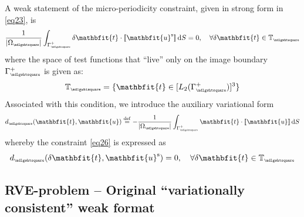 \documentclass[12pt,a4paper]{article}
\renewcommand{\ta}[1]{\mathbfit{#1}}
\renewcommand{\Box}{\mdlgwhtsquare}
\DeclarePairedDelimiter{\jmp}{[\![}{]\!]}
\newcommand{\volume}{|\Omega_\rve|}
\newcommand{\rve}{
  {\mathchoice
   {\mbox{\scalebox{0.67}{$\Box$}}}
   {\mbox{\scalebox{0.67}{$\Box$}}}
   {\mbox{\scalebox{0.5}{$\Box$}}}
   {\mbox{\scalebox{0.375}{$\Box$}}}
  }
}
\begin{document}
A weak statement of the micro-periodicity constraint, given in strong form in \cref{eq23}, is
\begin{equation}
    \frac{1}{\volume}\int_{\Gamma_\rve^+} \delta \ta{t} \cdot \jmp{\ta{u}^\fluct} \dif S = 0,
    \quad \forall \delta \ta{t}\in\set{T}_\rve
\label{eq26}
\end{equation}
where the space of test functions that ``live'' only on the image boundary $\Gamma_\rve^+$ is given as:
\begin{equation}
    \set{T}_\rve = \{\ta{t}\in [L_2(\Gamma_\rve^+)]^{3}\}
\label{eq25a}
\end{equation}
Associated with this condition, we introduce the auxiliary variational form
\begin{equation}
    d_\rve(\ta{t},\ta{u}) \defeq
    - \frac{1}{\volume}\int_{\Gamma_\rve^+} \ta{t} \cdot \jmp{\ta{u}} \dif S
\label{eq27}
\end{equation}
whereby the constraint \cref{eq26} is expressed as
\begin{equation}
    d_\rve(\delta\ta{t},\ta{u}^\fluct) = 0, \quad \forall \delta \ta{t}\in\set{T}_\rve
\label{eq27a}
\end{equation}

\subsection{RVE-problem -- Original ``variationally consistent'' weak format}
\end{document}
